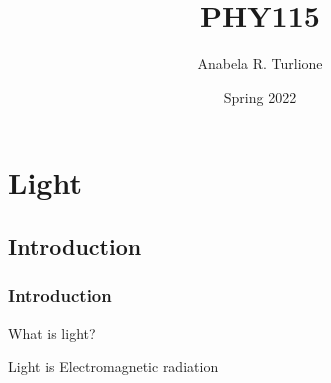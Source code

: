 \documentclass[]{beamer}
\title{PHY115}    %
\author{Anabela R. Turlione}                 %
\institute{Digipen}      %
\date{Spring 2022}                    %
\begin{document}
\begin{frame}
  \titlepage
\end{frame}

\section[]{}

\begin{frame}
  \tableofcontents
\end{frame}

\section{Light}
\subsection{Introduction}


\begin{frame}
  \frametitle{Introduction}
  
What is light?
\pause
\vspace{10mm}

Light is Electromagnetic radiation


  
    \end{frame}
  
\end{document}
